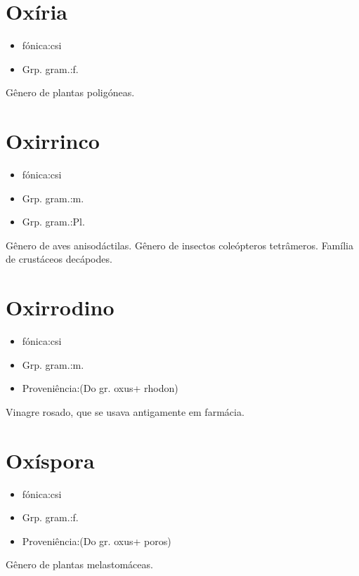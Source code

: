 \section{Oxíria}
\begin{itemize}
\item {fónica:csi}
\end{itemize}
\begin{itemize}
\item {Grp. gram.:f.}
\end{itemize}
Gênero de plantas poligóneas.
\section{Oxirrinco}
\begin{itemize}
\item {fónica:csi}
\end{itemize}
\begin{itemize}
\item {Grp. gram.:m.}
\end{itemize}
\begin{itemize}
\item {Grp. gram.:Pl.}
\end{itemize}
Gênero de aves anisodáctilas.
Gênero de insectos coleópteros tetrâmeros.
Família de crustáceos decápodes.
\section{Oxirrodino}
\begin{itemize}
\item {fónica:csi}
\end{itemize}
\begin{itemize}
\item {Grp. gram.:m.}
\end{itemize}
\begin{itemize}
\item {Proveniência:(Do gr. \textunderscore oxus\textunderscore  + \textunderscore rhodon\textunderscore )}
\end{itemize}
Vinagre rosado, que se usava antigamente em farmácia.
\section{Oxíspora}
\begin{itemize}
\item {fónica:csi}
\end{itemize}
\begin{itemize}
\item {Grp. gram.:f.}
\end{itemize}
\begin{itemize}
\item {Proveniência:(Do gr. \textunderscore oxus\textunderscore  + \textunderscore poros\textunderscore )}
\end{itemize}
Gênero de plantas melastomáceas.
